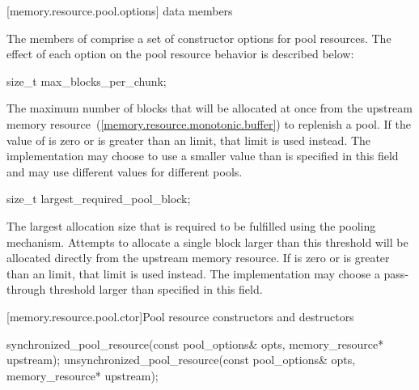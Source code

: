 [memory.resource.pool.options]{ data members}

\pnum
The members of 
comprise a set of constructor options for pool resources.
The effect of each option on the pool resource behavior is described below:

%
\begin{itemdecl}
size_t max_blocks_per_chunk;
\end{itemdecl}

\begin{itemdescr}
\pnum
The maximum number of blocks that will be allocated at once
from the upstream memory resource~(\ref{memory.resource.monotonic.buffer})
to replenish a pool.
If the value of  is zero or
is greater than an 
limit, that limit is used instead.
The implementation
may choose to use a smaller value than is specified in this field and
may use different values for different pools.
\end{itemdescr}

%
\begin{itemdecl}
size_t largest_required_pool_block;
\end{itemdecl}

\begin{itemdescr}
\pnum
The largest allocation size that is required to be fulfilled
using the pooling mechanism.
Attempts to allocate a single block larger than this threshold
will be allocated directly from the upstream memory resource.
If  is zero or
is greater than an 
limit, that limit is used instead.
The implementation may choose a pass-through threshold
larger than specified in this field.
\end{itemdescr}

[memory.resource.pool.ctor]{Pool resource constructors and destructors}

%
%
\begin{itemdecl}
synchronized_pool_resource(const pool_options& opts, memory_resource* upstream);
unsynchronized_pool_resource(const pool_options& opts, memory_resource* upstream);
\end{itemdecl}

